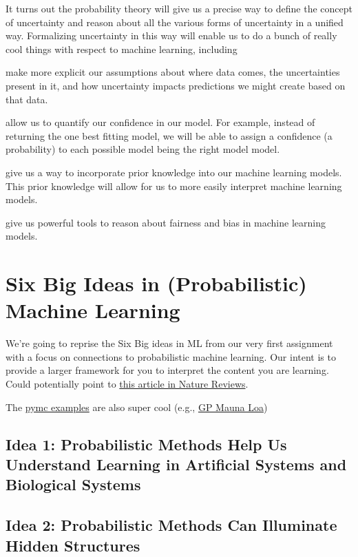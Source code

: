 \documentclass[assignment01_Solutions]{subfiles}
\begin{document}
It turns out the probability theory will give us a precise way to define the concept of uncertainty and reason about all the various forms of uncertainty in a unified way.  Formalizing uncertainty in this way will enable us to do a bunch of really cool things with respect to machine learning, including

\bi
\item make more explicit our assumptions about where data comes, the uncertainties present in it, and how uncertainty impacts predictions we might create based on that data.
\item allow us to quantify our confidence in our model.  For example, instead of returning the one best fitting model, we will be able to assign a confidence (a probability) to each possible model being the right model model.
\item give us a way to incorporate prior knowledge into our machine learning models.  This prior knowledge will allow for us to more easily interpret machine learning models.
\item give us powerful tools to reason about fairness and bias in machine learning models.
\ei

\section{Six Big Ideas in (Probabilistic) Machine Learning}
We're going to reprise the Six Big ideas in ML from our very first assignment with a focus on connections to probabilistic machine learning.  Our intent is to provide a larger framework for you to interpret the content you are learning.  Could potentially point to \href{https://www.nature.com/articles/nature14541.pdf}{this article in Nature Reviews}.


The \href{https://docs.pymc.io/nb_examples/index.html}{pymc examples} are also super cool (e.g., \href{https://docs.pymc.io/notebooks/GP-MaunaLoa.html}{GP Mauna Loa})

\subsection*{Idea 1: Probabilistic Methods Help Us Understand Learning in Artificial Systems and Biological Systems}

\subsection*{Idea 2: Probabilistic Methods Can Illuminate Hidden Structures}
\end{document}
